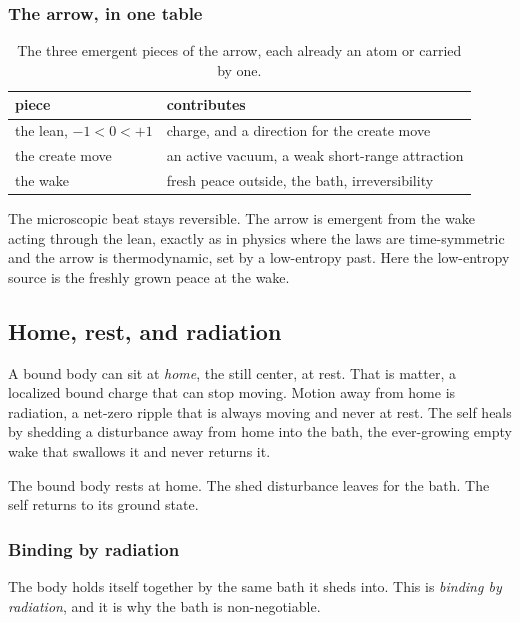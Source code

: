 \subsubsection{The arrow, in one table}

\begin{table}[ht]
\centering
\begin{tabular}{@{}p{}p{}@{}}
\toprule
piece & contributes \\
\midrule
the lean, $-1 < 0 < +1$ & charge, and a direction for the create move \\
the create move & an active vacuum, a weak short-range attraction \\
the wake & fresh peace outside, the bath, irreversibility \\
\bottomrule
\end{tabular}
\caption{The three emergent pieces of the arrow, each already an atom or carried by one.}
\label{tab:arrow-pieces}
\end{table}

The microscopic beat stays reversible. The arrow is emergent from the wake acting through the lean, exactly as in physics where the laws are time-symmetric and the arrow is thermodynamic, set by a low-entropy past. Here the low-entropy source is the freshly grown peace at the wake.

\subsection{Home, rest, and radiation}

A bound body can sit at \emph{home}, the still center, at rest. That is matter, a localized bound charge that can stop moving. Motion away from home is radiation, a net-zero ripple that is always moving and never at rest. The self heals by shedding a disturbance away from home into the bath, the ever-growing empty wake that swallows it and never returns it.

\begin{principle}
The bound body rests at home. The shed disturbance leaves for the bath. The self returns to its ground state.
\end{principle}

\subsubsection{Binding by radiation}

The body holds itself together by the same bath it sheds into. This is \emph{binding by radiation}, and it is why the bath is non-negotiable.


